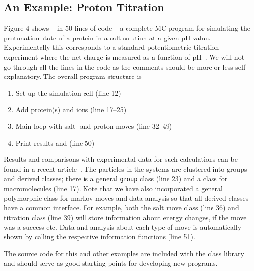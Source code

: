 \documentclass[10pt]{bmc_article}
\newenvironment{bmcformat}{\begin{raggedright}\baselineskip20pt\sloppy\setboolean{publ}{false}}{\end{raggedright}\baselineskip20pt\sloppy}
\begin{document}
\begin{bmcformat}


\subsection*{An Example: Proton Titration}
Figure 4 shows -- in 50 lines of code -- a complete MC program for simulating the protonation state of a protein in a salt solution at a given pH value.
Experimentally this corresponds to a standard potentiometric titration experiment where the net-charge is measured as a function of pH~\cite{tanford:72}.
We will not go through all the lines in the code as the comments should be more or less self-explanatory.
The overall program structure is
\begin{enumerate}
\item Set up the simulation cell (line 12)
\item Add protein(s) and ions (line 17--25)
\item Main loop with salt- and proton moves (line 32--49)
\item Print results and (line 50)
\end{enumerate}
Results and comparisons with experimental data for such calculations can be found in a recent article~\cite{lund:07}.
The particles in the systems are clustered into groups and derived classes; there is a general \verb"group" class (line 23) and a class for macromolecules (line 17).
Note that we have also incorporated a general polymorphic class for markov moves and data analysis so that all derived classes have a common interface.
For example, both the salt move class (line 36) and titration class (line 39) will store information about energy changes, if the move was a success etc.
Data and analysis about each type of move is automatically shown by calling the respective information functions (line 51).

The source code for this and other examples are included with the class library and should serve as good starting points for developing new programs.


\end{bmcformat}
\end{document}

